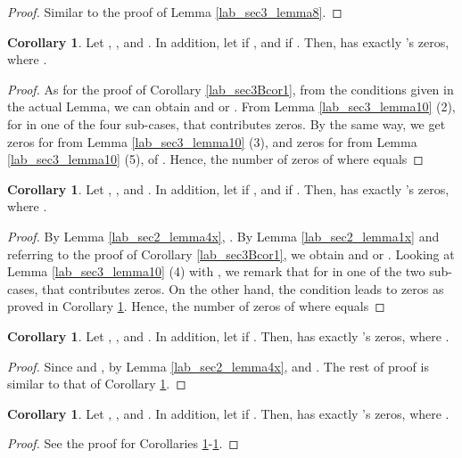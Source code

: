 \documentclass{mcom-l}
\theoremstyle{definition}
\newtheorem{sec3Ccor1}[sec3Bcor1]{Corollary}
\newtheorem{sec3Ccor2}[sec3Bcor1]{Corollary}
\newtheorem{sec3Ccor3}[sec3Bcor1]{Corollary}
\newtheorem{sec3Ccor4}[sec3Bcor1]{Corollary}
\numberwithin{equation}{section}
\begin{document}
    \begin{proof}
    Similar to the proof of Lemma \ref{lab_sec3_lemma8}.
    \end{proof} 
    \begin{sec3Ccor1}\label{lab_sec3Ccor1}
    Let , ,  and . In addition, let   if , and  if . Then,  has exactly 's zeros, where .
    \end{sec3Ccor1}
    \begin{proof}
      As for the proof of Corollary \ref{lab_sec3Bcor1}, from the conditions given in the actual Lemma, we can obtain  and  or . From Lemma \ref{lab_sec3_lemma10} (2),  for  in one of the four sub-cases, that contributes  zeros. By the same way, we get  zeros for  from Lemma \ref{lab_sec3_lemma10} (3), and  zeros for  from Lemma \ref{lab_sec3_lemma10} (5), of . Hence, the number of zeros of  where  equals 
      
    \end{proof} 
    \begin{sec3Ccor2}\label{lab_sec3Ccor2}
       Let , ,  and . In addition, let   if , and  if . Then,  has exactly 's zeros, where .
    \end{sec3Ccor2}
    \begin{proof}
    By Lemma \ref{lab_sec2_lemma4x}, . By Lemma \ref{lab_sec2_lemma1x} and referring to the proof of Corollary \ref{lab_sec3Bcor1}, we obtain  and  or . Looking at Lemma \ref{lab_sec3_lemma10} (4) with , we remark that  for  in one of the two sub-cases, that contributes  zeros. On the other hand, the condition  leads to  zeros as proved in Corollary \ref{lab_sec3Ccor1}. Hence, the number of zeros of  where  equals 
          
    \end{proof} 
    \begin{sec3Ccor3}\label{lab_sec3Ccor3}
    Let , ,  and . In addition, let   if . Then,  has exactly 's zeros, where .
    \end{sec3Ccor3}
    \begin{proof}
    Since  and , by Lemma \ref{lab_sec2_lemma4x},  and . The rest of proof is similar to that of Corollary \ref{lab_sec3Ccor2}.
    \end{proof} 
    \begin{sec3Ccor4}\label{lab_sec3Ccor4}
       Let , ,  and . In addition, let   if . Then,  has exactly 's zeros, where .
       \end{sec3Ccor4}
     \begin{proof}
     See the proof for Corollaries \ref{lab_sec3Ccor1}-\ref{lab_sec3Ccor3}.
     \end{proof} 
\end{document}
